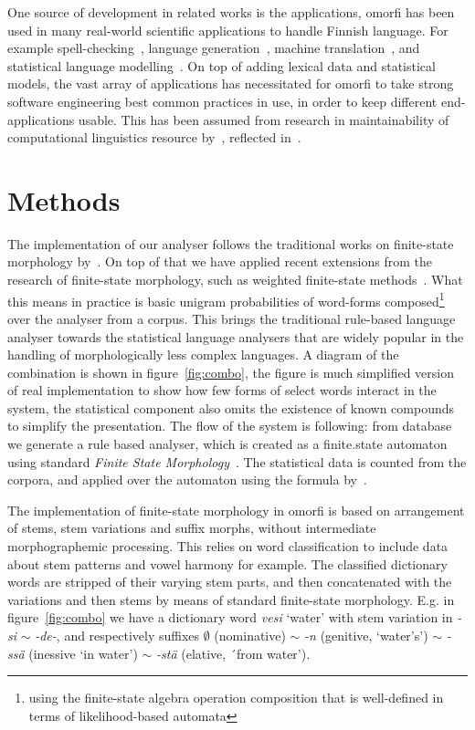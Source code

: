 \documentclass[a4paper,12pt]{article}
\begin{document}
One source of development in related works is the applications, omorfi has been
used in many real-world scientific applications to handle Finnish language.
For example spell-checking~\citep{pirinen2014weighted}, language
generation~\citep{toivanen2012corpus}, machine
translation~\citep{clifton2011combining,toral2015abumatran}, and statistical
language modelling~\citep{haverinen2013building,bohnet2013joint}. On top of
adding lexical data and statistical models, the vast array of applications has
necessitated for omorfi to take strong software engineering best common
practices in use, in order to keep different end-applications usable. This has
been assumed from research in maintainability of computational linguistics
resource by~\citet{maxwell}, reflected in~\citet{pirinen}.




\section{Methods}
\label{sec:methods}

The implementation of our analyser follows the traditional works on finite-state
morphology by~\citet{beesley2003finite}. On top of that we have applied recent
extensions from the research of finite-state morphology, such as weighted
finite-state methods~\citep{openfst,hfst2012}. What this means in practice is
basic unigram probabilities of word-forms composed\footnote{using the
    finite-state algebra operation composition that is well-defined in terms of
likelihood-based automata} over the analyser from a corpus.  This brings the
traditional rule-based language analyser towards the statistical language
analysers that are widely popular in the handling of morphologically less
complex languages. A diagram of the combination is shown in 
figure~\ref{fig:combo}, the figure is much simplified version of real
implementation to show how few forms of select words interact in the system, the
statistical component also omits the existence of known compounds to simplify
the presentation. The flow of the system is following: from database we generate
a rule based analyser, which is created as a finite.state automaton using
standard \textit{Finite State Morphology}~\citep{beesley2003finite}. The
statistical data is counted from the corpora, and applied over the automaton
using the formula by~\cite{pirinen}.

The implementation of finite-state morphology in omorfi is based on arrangement
of stems, stem variations and suffix morphs, without intermediate
morphographemic processing. This relies on word classification to include data
about stem patterns and vowel harmony for example. The classified dictionary
words are stripped of their varying stem parts, and then concatenated with the
variations and then stems by means of standard finite-state morphology. E.g.
in figure~\ref{fig:combo} we have a dictionary word 
\emph{vesi} `water' with stem variation in \emph{-si} $\sim$
\emph{-de-}, and respectively suffixes
$\emptyset$ (nominative) $\sim$ \emph{-n} (genitive, `water's') $\sim$
\emph{-ssä} (inessive `in water')  $\sim$ \emph{-stä} (elative, ´from
water').
\end{document}
